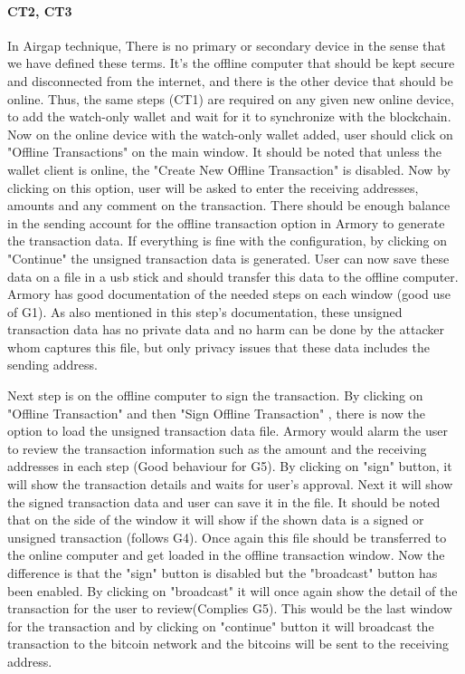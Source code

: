 \paragraph{CT2, CT3} 
In Airgap technique, There is no primary or secondary device in the sense that we have defined these terms. It's the offline computer that should be kept secure and disconnected from the internet, and there is the other device that should be online. Thus, the same steps (CT1) are required on any given new online device, to add the watch-only wallet and wait for it to synchronize with the blockchain.\\
Now on the online device with the watch-only wallet added, user should click on "Offline Transactions" on the main window. It should be noted that unless the wallet client is online, the "Create New Offline Transaction" is disabled. Now by clicking on this option, user will be asked to enter the receiving addresses, amounts and any comment on the transaction. There should be enough balance in the sending account for the offline transaction option in Armory to generate the transaction data. If everything is fine with the configuration, by clicking on "Continue" the unsigned transaction data is generated. User can now save these data on a file in a usb stick and should transfer this data to the offline computer. Armory has good documentation of the needed steps on each window (good use of G1). As also mentioned in this step's documentation, these unsigned transaction data has no private data and no harm can be done by the attacker whom captures this file, but only privacy issues that these data includes the sending address.

Next step is on the offline computer to sign the transaction. By clicking on "Offline Transaction" and then "Sign Offline Transaction" , there is now the option to load the unsigned transaction data file. Armory would alarm the user to review the transaction information such as the amount and the receiving addresses in each step (Good behaviour for G5). By clicking on "sign" button, it will show the transaction details and waits for user's approval.  Next it will show the signed transaction data and user can save it in the file. It should be noted that on the side of the window it will show if the shown data is a signed or unsigned transaction (follows G4). 
Once again this file should be transferred to the online computer and get loaded in the offline transaction window. Now the difference is that the "sign" button is disabled but the "broadcast" button has been enabled. By clicking on "broadcast" it will once again show the detail of the transaction for the user to review(Complies G5). This would be the last window for the transaction and by clicking on "continue" button it will broadcast the transaction to the bitcoin network and the bitcoins will be sent to the receiving address.


